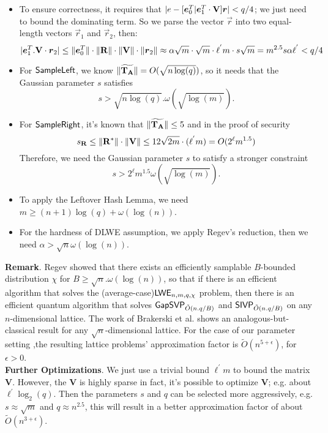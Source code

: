 \begin{itemize}
 \item To ensure correctness, it requires that $|e-[\boldsymbol{e}^{T}_{0}|\boldsymbol{e}^{T}_{1}\cdot \mathbf{V}]\boldsymbol{r}|< q/4$; we just need to bound the dominating term. So we parse the  vector $\vec{r}$ into two equal-length vectors $\vec{r}_{1}$ and $\vec{r}_{2}$, then:
 \begin{equation}
       |\boldsymbol{e}^{T}_{1}.\mathbf{V}\cdot \boldsymbol{r}_{2}|\leq \| \boldsymbol{e}^{T}_{0}\|\cdot \| \mathbf{R}\|
       \cdot \| \mathbf{V}\| \cdot \| \boldsymbol{r}_{2}\|\approx \alpha\sqrt{m}\cdot \sqrt{m}\cdot \ell^{'}m\cdot s\sqrt{m}=m^{2.5}s\alpha \ell^{'}< q/4
\end{equation}
 \item For $\mathsf{SampleLeft}$, we know $\| \widetilde{\mathbf{T}_{\mathbf{A}}}\|=O(\sqrt{n\log(q)})$, so it needs that the Gaussian parameter $s$ satisfies
 \begin{equation}
 s>\sqrt{n\log(q)}.\omega(\sqrt{\log(m)}).
 \end{equation}
 \item For $\mathsf{SampleRight}$, it's known that $\| \widetilde{\mathbf{T}_{\mathbf{A}}}\|\leq 5$ and in the proof of security
 \begin{equation}
 s_{\mathbf{R}}\leq \| \mathbf{R}^{*}\| \cdot \| \mathbf{V}\|\leq 12\sqrt{2m}\cdot (\ell^{'}m)=O(2^{\ell}m^{1.5})
 \end{equation}
 Therefore, we need the Gaussian parameter $s$ to satisfy a stronger constraint
 \begin{equation}
 s>2^{\ell}m^{1.5}\omega(\sqrt{\log(m)}).
 \end{equation}
 \item To apply the Leftover Hash Lemma, we need $m\geq (n+1)\log(q)+\omega(\log(n))$.
 \item For the hardness of DLWE assumption, we apply Regev's reduction, then we need $\alpha >\sqrt{n}\omega(\log(n))$.
\end{itemize}
\textbf{Remark}. Regev \cite{STOC:Regev05} showed that there exists an efficiently samplable $B$-bounded distribution $\chi$ for $B\geq \sqrt{n}.\omega(\log(n))$, so that if there is an efficient algorithm that solves the (average-case)$\mathsf{LWE}_{n,m,q,\chi}$ problem, then there is an efficient quantum algorithm that solves $\mathsf{GapSVP}_{\tilde{O}(n.q/B)}$ and $\mathsf{SIVP}_{\tilde{O}(n.q/B)}$ on any $n$-dimensional lattice. The work of Brakerski et al.\cite{STOC:BLPRS13} shows an analogous-but-classical result for any $\sqrt{n}$-dimensional lattice. For the case of our parameter setting ,the resulting lattice problems' approximation factor is $\widetilde{O}(n^{5+\epsilon})$, for $\epsilon>0$.\\[0.6cm]
\textbf{Further Optimizations}. We just use a trivial bound $\ell^{'}m$ to bound the matrix $\textbf{V}$. However, the $\textbf{V}$ is highly sparse in fact, it's possible to optimize $\textbf{V}$; e.g. about $\ell^{'}\log_{2}(q)$. Then the parameters $s$ and $q$ can be selected more aggressively, e.g. $s\approx \sqrt{m}$ and $q\approx n^{2.5}$, this will result in a better approximation factor of about $\widetilde{O}(n^{3+\epsilon})$.\

